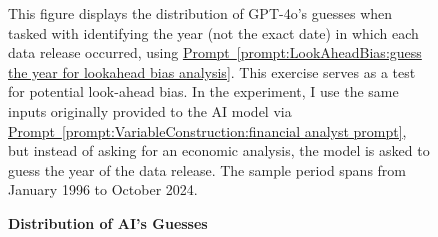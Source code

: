 \documentclass[12pt,oneside,letter]{article}
\newcommand*{\myprp}[1]{\hyperref[{#1}]{Prompt~\ref*{#1}}}
\begin{document}
\begin{landscape}
	
	\begin{figure}

	    \begin{center}
	    	\caption{\bf Distribution of AI's Guesses}
		    \medskip
		     \label{fig:LookAheadBias:how many guess each year}
	    \end{center}
	
	
	    \begin{small}
	    This figure displays the distribution of GPT-4o’s guesses when tasked with identifying the year (not the exact date) in which each data release occurred, using \myprp{prompt:LookAheadBias:guess the year for lookahead bias analysis}. This exercise serves as a test for potential look-ahead bias. In the experiment, I use the same inputs originally provided to the AI model via \myprp{prompt:VariableConstruction:financial analyst prompt}, but instead of asking for an economic analysis, the model is asked to guess the year of the data release. The sample period spans from January 1996 to October 2024.
	    \end{small}


	\end{figure}

\end{landscape}
\end{document}
